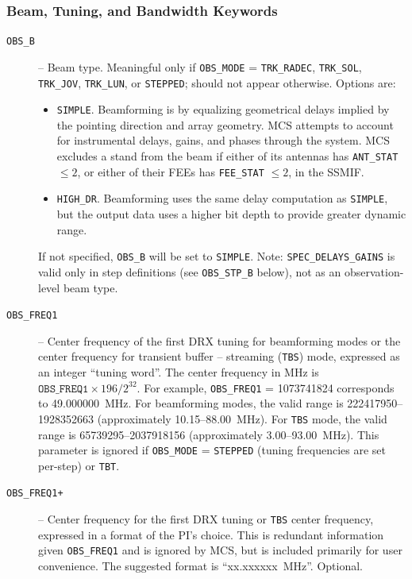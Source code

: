 \subsubsection{Beam, Tuning, and Bandwidth Keywords}

\begin{description}
\item[\texttt{OBS\_B}] -- Beam type.  Meaningful only if \texttt{OBS\_MODE} = \texttt{TRK\_RADEC}, \texttt{TRK\_SOL}, \texttt{TRK\_JOV}, \texttt{TRK\_LUN}, or \texttt{STEPPED}; should not appear otherwise.  Options are:
\begin{itemize}
\item \texttt{SIMPLE}.  Beamforming is by equalizing geometrical delays implied by the pointing direction and array geometry.  MCS attempts to account for instrumental delays, gains, and phases through the system.  MCS excludes a stand from the beam if either of its antennas has \texttt{ANT\_STAT} $\le 2$, or either of their FEEs has \texttt{FEE\_STAT} $\le 2$, in the SSMIF.
\item \texttt{HIGH\_DR}.  Beamforming uses the same delay computation as \texttt{SIMPLE}, but the output data uses a higher bit depth to provide greater dynamic range.
\end{itemize}
If not specified, \texttt{OBS\_B} will be set to \texttt{SIMPLE}.  Note: \texttt{SPEC\_DELAYS\_GAINS} is valid only in step definitions (see \texttt{OBS\_STP\_B} below), not as an observation-level beam type.

\item[\texttt{OBS\_FREQ1}] -- Center frequency of the first DRX tuning for beamforming modes or the center frequency for transient buffer -- streaming (\texttt{TBS}) mode, expressed as an integer ``tuning word''.  The center frequency in MHz is $\texttt{OBS\_FREQ1} \times 196 / 2^{32}$.  For example, \texttt{OBS\_FREQ1} = 1073741824 corresponds to 49.000000~MHz.  For beamforming modes, the valid range is 222417950--1928352663 (approximately 10.15--88.00~MHz).  For \texttt{TBS} mode, the valid range is 65739295--2037918156 (approximately 3.00--93.00~MHz).  This parameter is ignored if \texttt{OBS\_MODE} = \texttt{STEPPED} (tuning frequencies are set per-step) or \texttt{TBT}.

\item[\texttt{OBS\_FREQ1+}] -- Center frequency for the first DRX tuning or \texttt{TBS} center frequency, expressed in a format of the PI's choice.  This is redundant information given \texttt{OBS\_FREQ1} and is ignored by MCS, but is included primarily for user convenience.  The suggested format is ``xx.xxxxxx~MHz''.  Optional.


\end{description}
